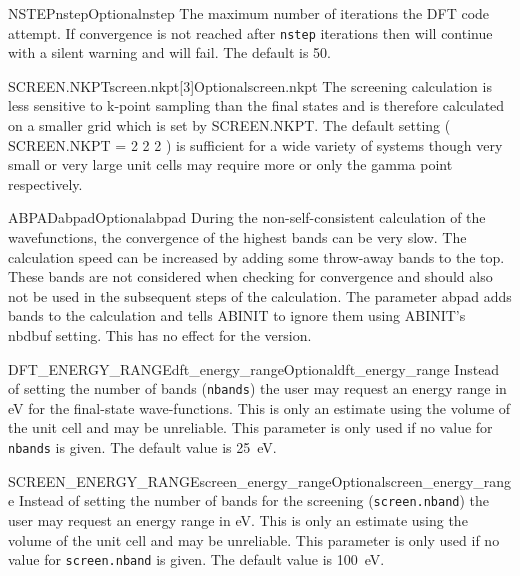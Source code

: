 \documentclass[11pt]{report}
\begin{document}
\begin{Card}{NSTEP}{nstep}{Optional}{nstep}
The maximum number of iterations the DFT code attempt. If convergence is not reached after \texttt{nstep} iterations then  will continue with a silent warning and  will fail.
The default is 50.
\end{Card} 

\begin{Card}{SCREEN.NKPT}{screen.nkpt[3]}{Optional}{screen.nkpt}
The screening calculation is less sensitive to k-point sampling than the final states and is therefore calculated on a smaller grid which is set by SCREEN.NKPT. The default setting ( SCREEN.NKPT = 2 2 2 ) is sufficient for a wide variety of systems though very small or very large unit cells may require more or only the gamma point respectively. 
\end{Card}

\begin{Card}{ABPAD}{abpad}{Optional}{abpad}
During the non-self-consistent calculation of the wavefunctions, the convergence of the highest bands can be very slow. The calculation speed can be increased by adding some throw-away bands to the top. These bands are not considered when checking for convergence and should also not be used in the subsequent steps of the calculation. The parameter abpad adds bands to the calculation and tells ABINIT to ignore them using ABINIT's nbdbuf setting. This has no effect for the  version. 
\end{Card}

\begin{Card}{DFT\_ENERGY\_RANGE}{dft\_energy\_range}{Optional}{dft_energy_range}
Instead of setting the number of bands (\texttt{nbands}) the user may request an energy range in eV for the final-state wave-functions. 
This is only an estimate using the volume of the unit cell and may be unreliable. 
This parameter is only used if no value for \texttt{nbands} is given. The default value is 25~eV.
\end{Card}

\begin{Card}{SCREEN\_ENERGY\_RANGE}{screen\_energy\_range}{Optional}{screen_energy_range}
Instead of setting the number of bands for the screening (\texttt{screen.nband}) the user may request an energy range in eV. 
This is only an estimate using the volume of the unit cell and may be unreliable. 
This parameter is only used if no value for \texttt{screen.nband} is given. The default value is 100~eV. 
\end{Card}
\end{document}
